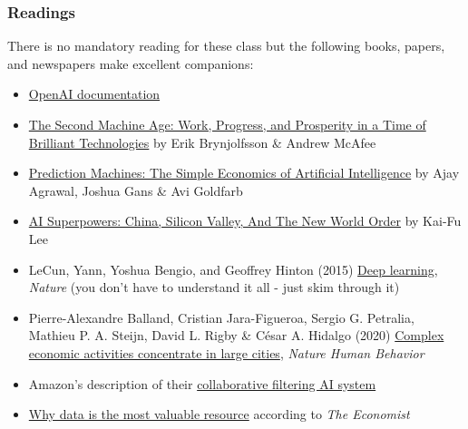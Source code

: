 \documentclass[
]{article}
\providecommand{\tightlist}{%
  \setlength{\itemsep}{0pt}\setlength{\parskip}{0pt}}
\begin{document}
\hypertarget{readings}{%
\subsubsection{Readings}\label{readings}}

There is no mandatory reading for these class but the following books,
papers, and newspapers make excellent companions:

\begin{itemize}
\tightlist
\item
  \href{https://openai.com/blog?authors=openai}{OpenAI documentation}
\item
  \href{https://www.amazon.com/Second-Machine-Age-Prosperity-Technologies/dp/0393350649}{The
  Second Machine Age: Work, Progress, and Prosperity in a Time of
  Brilliant Technologies} by Erik Brynjolfsson \& Andrew McAfee\\
\item
  \href{https://www.amazon.com/Prediction-Machines-Economics-Artificial-Intelligence/dp/1633695670}{Prediction
  Machines: The Simple Economics of Artificial Intelligence} by Ajay
  Agrawal, Joshua Gans \& Avi Goldfarb\\
\item
  \href{https://www.amazon.com/AI-Superpowers-China-Silicon-Valley/dp/132854639X}{AI
  Superpowers: China, Silicon Valley, And The New World Order} by Kai-Fu
  Lee\\
\item
  LeCun, Yann, Yoshua Bengio, and Geoffrey Hinton (2015)
  \href{https://www.nature.com/articles/nature14539}{Deep learning},
  \emph{Nature} (you don't have to understand it all - just skim through
  it)\\
\item
  Pierre-Alexandre Balland, Cristian Jara-Figueroa, Sergio G. Petralia,
  Mathieu P. A. Steijn, David L. Rigby \& César A. Hidalgo (2020)
  \href{https://www.nature.com/articles/s41562-019-0803-3\#:~:text=Complex\%20economic\%20activities\%2C\%20such\%20as,as\%20apparel\%20or\%20paper\%20manufacturing.}{Complex
  economic activities concentrate in large cities}, \emph{Nature Human
  Behavior}\\
\item
  Amazon's description of their
  \href{https://www.amazon.science/the-history-of-amazons-recommendation-algorithm}{collaborative
  filtering AI system}\\
\item
  \href{https://www.economist.com/leaders/2017/05/06/the-worlds-most-valuable-resource-is-no-longer-oil-but-data}{Why
  data is the most valuable resource} according to \emph{The Economist}
\end{itemize}
\end{document}

